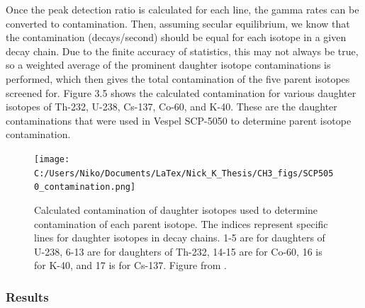\documentclass{report}
\begin{document}
Once the peak detection ratio is calculated for each line, the gamma rates can be converted to contamination. Then, assuming secular equilibrium, we know that the contamination (decays/second) should be equal for each isotope in a given decay chain. Due to the finite accuracy of statistics, this may not always be true, so a weighted average of the prominent daughter isotope contaminations is performed, which then gives the total contamination of the five parent isotopes screened for. Figure 3.5 shows the calculated contamination for various daughter isotopes of Th-232, U-238, Cs-137, Co-60, and K-40. These are the daughter contaminations that were used in Vespel SCP-5050 to determine parent isotope contamination.

\begin{figure}
\centering
\texttt{[image: C:/Users/Niko/Documents/LaTex/Nick\_K\_Thesis/CH3\_figs/SCP5050\_contamination.png]}
\caption{Calculated contamination of daughter isotopes used to determine contamination of each parent isotope. The indices represent specific lines for daughter isotopes in decay chains. 1-5 are for daughters of U-238, 6-13 are for daughters of Th-232, 14-15 are for Co-60, 16 is for K-40, and 17 is for Cs-137. Figure from \cite{GopherSCP5050}. }
\end{figure}

\subsubsection{Results}
\end{document}
